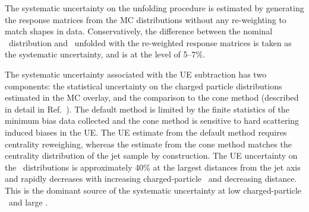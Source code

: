 The systematic uncertainty on the unfolding procedure is estimated by generating the response matrices from the MC distributions without any re-weighting to match shapes in data. Conservatively, the difference between the nominal \Dptr\ distribution and \Dptr\ unfolded with the re-weighted response matrices is taken as the systematic uncertainty, and is at the level of 5--7\%.

The systematic uncertainty associated with the UE subtraction has two components: the statistical uncertainty on the charged particle distributions estimated in the MC overlay, and the comparison to the cone method (described in detail in Ref.~\cite{Aaboud:2017bzv}). The default method is limited by the finite statistics of the minimum bias data collected and the cone method is sensitive to hard scattering induced biases in the UE. The UE estimate from the default method requires centrality reweighing, whereas the estimate from the cone method matches the centrality distribution of the jet sample by construction. The UE uncertainty on the \Dptr\ distributions is approximately 40\% at the largest distances from the jet axis and rapidly decreases with increasing charged-particle \pT\ and decreasing distance. This is the dominant source of the systematic uncertainty at low charged-particle \pt\ and large \rvar.





